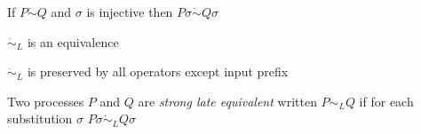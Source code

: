 \begin{proposition}
  If $P \dot{\sim} Q$ and $\sigma$ is injective then $P\sigma \dot{\sim} Q\sigma$
% 	
\end{proposition}

\begin{proposition}
  $\dot{\sim}_{L}$ is an equivalence
\end{proposition}

\begin{proposition}
  $\dot{\sim}_{L}$ is preserved by all operators except input prefix
\end{proposition}

\begin{definition}
  Two processes $P$ and $Q$ are \emph{strong late equivalent} written $P\sim_{L}Q$ if for each substitution $\sigma$ $P\sigma \dot{\sim}_{L}Q\sigma$
\end{definition}

